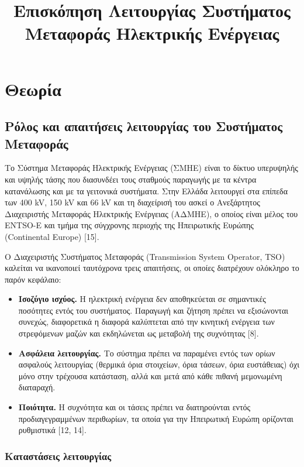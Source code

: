 \title{Επισκόπηση Λειτουργίας Συστήματος Μεταφοράς Ηλεκτρικής Ενέργειας}

\section{Θεωρία}
\label{kef-01-theoria}

\subsection{Ρόλος και απαιτήσεις λειτουργίας του Συστήματος Μεταφοράς}

Το Σύστημα Μεταφοράς Ηλεκτρικής Ενέργειας (ΣΜΗΕ) είναι το δίκτυο υπερυψηλής και υψηλής τάσης
που διασυνδέει τους σταθμούς παραγωγής με τα κέντρα κατανάλωσης και με τα γειτονικά συστήματα.
Στην Ελλάδα λειτουργεί στα επίπεδα των 400 kV, 150 kV και 66 kV και τη διαχείρισή του ασκεί
ο Ανεξάρτητος Διαχειριστής Μεταφοράς Ηλεκτρικής Ενέργειας (ΑΔΜΗΕ), ο οποίος είναι μέλος του
ENTSO-E και τμήμα της σύγχρονης περιοχής της Ηπειρωτικής Ευρώπης (Continental Europe) [15].

Ο Διαχειριστής Συστήματος Μεταφοράς (Transmission System Operator, TSO) καλείται να ικανοποιεί
ταυτόχρονα τρεις απαιτήσεις, οι οποίες διατρέχουν ολόκληρο το παρόν κεφάλαιο:

\begin{itemize}
\item \textbf{Ισοζύγιο ισχύος.} Η ηλεκτρική ενέργεια δεν αποθηκεύεται σε σημαντικές ποσότητες
      εντός του συστήματος. Παραγωγή και ζήτηση πρέπει να εξισώνονται συνεχώς, διαφορετικά η
      διαφορά καλύπτεται από την κινητική ενέργεια των στρεφόμενων μαζών και εκδηλώνεται ως
      μεταβολή της συχνότητας [8].
\item \textbf{Ασφάλεια λειτουργίας.} Το σύστημα πρέπει να παραμένει εντός των ορίων ασφαλούς
      λειτουργίας (θερμικά όρια στοιχείων, όρια τάσεων, όρια ευστάθειας) όχι μόνο στην τρέχουσα
      κατάσταση, αλλά και μετά από κάθε πιθανή μεμονωμένη διαταραχή.
\item \textbf{Ποιότητα.} Η συχνότητα και οι τάσεις πρέπει να διατηρούνται εντός προδιαγεγραμμένων
      περιθωρίων, τα οποία για την Ηπειρωτική Ευρώπη ορίζονται ρυθμιστικά [12, 14].
\end{itemize}

\subsubsection*{Καταστάσεις λειτουργίας}

